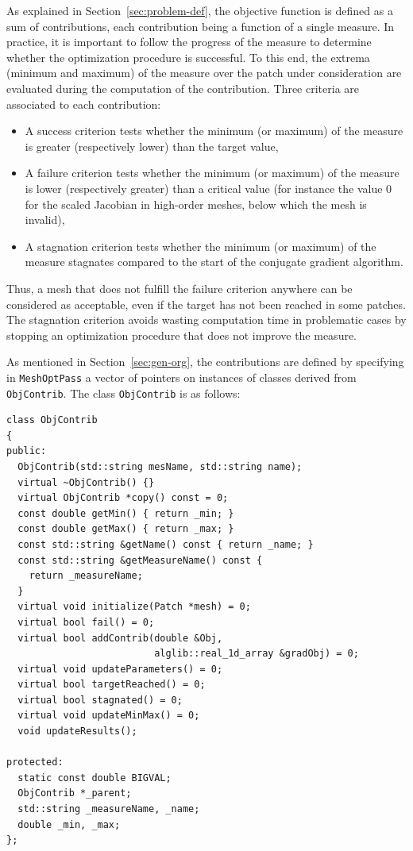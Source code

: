 \documentclass[12pt,a4paper,a4wide]{article}
\begin{document}
As explained in Section~\ref{sec:problem-def}, the objective
function is defined as a sum of contributions, each
contribution being a function of a single measure. In practice,
it is important to follow the progress of the measure to determine
whether the optimization procedure is successful. To this end, the
extrema (minimum and maximum) of the measure over the patch under
consideration are evaluated during the computation of the contribution.
Three criteria are associated to each contribution:
\begin{itemize}
\item A success criterion tests whether the minimum (or maximum)
of the measure is greater (respectively lower) than the target value,
\item A failure criterion tests whether the minimum (or maximum)
of the measure is lower (respectively greater) than a critical value
(for instance the value 0 for the scaled Jacobian in high-order meshes,
below which the mesh is invalid),
\item A stagnation criterion tests whether the minimum (or maximum)
of the measure stagnates compared to the start of the conjugate
gradient algorithm.
\end{itemize}
Thus, a mesh that does not fulfill the failure criterion anywhere can
be considered as acceptable, even if the target has not been reached
in some patches. The stagnation criterion avoids wasting
computation time in problematic cases by stopping an optimization
procedure that does not improve the measure.

As mentioned in Section~\ref{sec:gen-org}, the contributions
are defined by specifying in \texttt{MeshOptPass} a vector of
pointers on instances of classes derived from \texttt{ObjContrib}.
The class \texttt{ObjContrib} is as follows:

\begin{verbatim}
class ObjContrib
{
public:
  ObjContrib(std::string mesName, std::string name);
  virtual ~ObjContrib() {}
  virtual ObjContrib *copy() const = 0;
  const double getMin() { return _min; }
  const double getMax() { return _max; }
  const std::string &getName() const { return _name; }
  const std::string &getMeasureName() const {
    return _measureName;
  }
  virtual void initialize(Patch *mesh) = 0;
  virtual bool fail() = 0;
  virtual bool addContrib(double &Obj,
                          alglib::real_1d_array &gradObj) = 0;
  virtual void updateParameters() = 0;
  virtual bool targetReached() = 0;
  virtual bool stagnated() = 0;
  virtual void updateMinMax() = 0;
  void updateResults();

protected:
  static const double BIGVAL;
  ObjContrib *_parent;
  std::string _measureName, _name;
  double _min, _max;
};
\end{verbatim}
\end{document}
